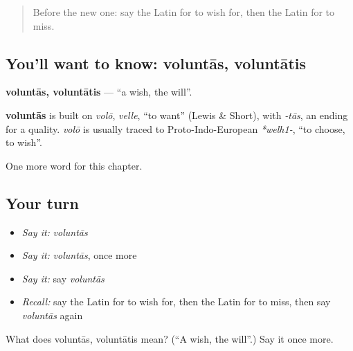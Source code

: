 \label{lesson:LA-C111-voluntas}



\begin{quote}
Before the new one: say the Latin for to wish for, then the Latin for to miss.
\end{quote}

\subsection*{You'll want to know: voluntās, voluntātis}
\textbf{voluntās, voluntātis} — \textquotedblleft{}a wish, the will\textquotedblright{}.

\begin{cousinweb}
\textbf{voluntās} is built on \emph{volō}, \emph{velle}, \textquotedblleft{}to want\textquotedblright{} (Lewis \& Short), with \emph{-tās}, an ending for a quality. \emph{volō} is usually traced to Proto-Indo-European \emph{*welh1-}, \textquotedblleft{}to choose, to wish\textquotedblright{}.
\end{cousinweb}

\begin{grammarlens}[title={What you've built}]
One more word for this chapter.
\end{grammarlens}

\subsection*{Your turn}
\begin{itemize}
\raggedright
  \item \emph{Say it:} \emph{voluntās}
  \item \emph{Say it:} \emph{voluntās}, once more
  \item \emph{Say it:} say \emph{voluntās}
  \item \emph{Recall:} say the Latin for to wish for, then the Latin for to miss, then say \emph{voluntās} again
\end{itemize}

\begin{tcolorbox}[breakable,colback=teal!4,colframe=teal!35!black,title={Before you move on}]
What does voluntās, voluntātis mean? (\textquotedblleft{}A wish, the will\textquotedblright{}.) Say it once more.
\end{tcolorbox}
